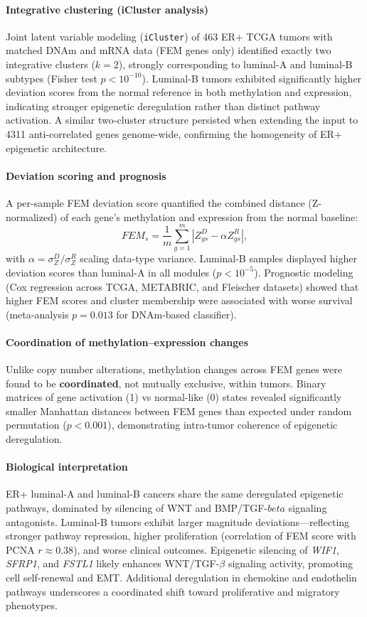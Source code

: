 \documentclass[10pt]{extarticle}
\begin{document}
\paragraph{Integrative clustering (iCluster analysis)}
Joint latent variable modeling (\texttt{iCluster}) of 463 ER+ TCGA tumors with matched DNAm and mRNA data (FEM genes only) identified exactly two integrative clusters (\(k=2\)), strongly corresponding to luminal-A and luminal-B subtypes (Fisher test \(p < 10^{-10}\)).  
Luminal-B tumors exhibited significantly higher deviation scores from the normal reference in both methylation and expression, indicating stronger epigenetic deregulation rather than distinct pathway activation. A similar two-cluster structure persisted when extending the input to 4311 anti-correlated genes genome-wide, confirming the homogeneity of ER+ epigenetic architecture.

\paragraph{Deviation scoring and prognosis}
A per-sample FEM deviation score quantified the combined distance (Z-normalized) of each gene’s methylation and expression from the normal baseline:
\[
FEM_s = \frac{1}{m} \sum_{g=1}^{m} |Z^D_{gs} - \alpha Z^R_{gs}|,
\]
with \(\alpha = \sigma_Z^D / \sigma_Z^R\) scaling data-type variance.  
Luminal-B samples displayed higher deviation scores than luminal-A in all modules (\(p<10^{-5}\)). Prognostic modeling (Cox regression across TCGA, METABRIC, and Fleischer datasets) showed that higher FEM scores and cluster membership were associated with worse survival (meta-analysis \(p=0.013\) for DNAm-based classifier).

\paragraph{Coordination of methylation–expression changes}
Unlike copy number alterations, methylation changes across FEM genes were found to be \textbf{coordinated}, not mutually exclusive, within tumors. Binary matrices of gene activation (1) vs normal-like (0) states revealed significantly smaller Manhattan distances between FEM genes than expected under random permutation (\(p<0.001\)), demonstrating intra-tumor coherence of epigenetic deregulation.

\paragraph{Biological interpretation}
ER+ luminal-A and luminal-B cancers share the same deregulated epigenetic pathways, dominated by silencing of WNT and BMP/TGF-$beta$ signaling antagonists. Luminal-B tumors exhibit larger magnitude deviations—reflecting stronger pathway repression, higher proliferation (correlation of FEM score with PCNA \(r \approx 0.38\)), and worse clinical outcomes.  
Epigenetic silencing of \textit{WIF1}, \textit{SFRP1}, and \textit{FSTL1} likely enhances WNT/TGF-$\beta$ signaling activity, promoting cell self-renewal and EMT. Additional deregulation in chemokine and endothelin pathways underscores a coordinated shift toward proliferative and migratory phenotypes.
\end{document}
